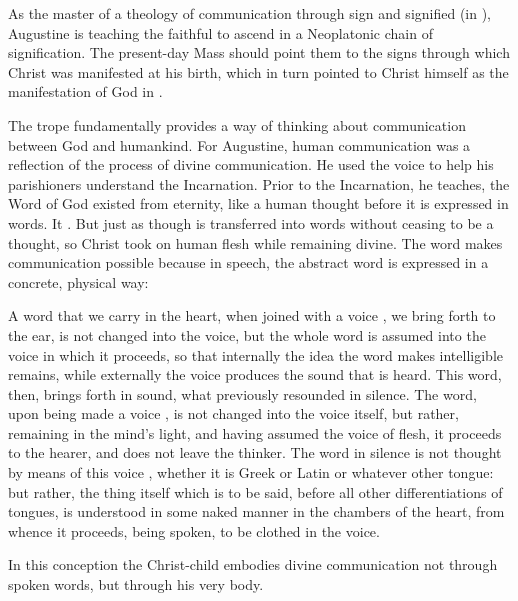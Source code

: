 As the master of a theology of communication through sign and signified (in
), Augustine is teaching the faithful to ascend in
a Neoplatonic chain of signification.
The present-day Mass should point them to the signs through which Christ was
manifested at his birth, which in turn pointed to Christ himself as the
manifestation of God in .

The  trope fundamentally provides a way of thinking about
communication between God and humankind.
For Augustine, human communication was a reflection of the process of divine
communication. 
He used the voice to help his parishioners understand the Incarnation.
Prior to the Incarnation, he teaches, the Word of God existed from eternity,
like a human thought before it is expressed in words.
It .%
    \Autocite[1001, Sermo 187, In Natali Domini 4]{Augustine:SermonesPL}
But just as though is transferred into words without ceasing to be a thought,
so Christ took on human flesh while remaining divine.
The word makes communication possible because in speech, the abstract word is
expressed in a concrete, physical way:
\begin{quoting}
    A word  that we carry in the heart, when
    joined with a voice , we bring
    forth to the ear, is not changed into the voice, but the whole word is
    assumed into the voice in which it proceeds, so that internally the idea the
    word makes intelligible remains, while externally the voice produces the
    sound that is heard.
    This word, then, brings forth in sound, what previously resounded in
    silence.  The word, upon being made a voice , is
    not changed into the voice itself, but rather, remaining in the mind's
    light, and having assumed the voice  of flesh, it proceeds to
    the hearer, and does not leave the thinker.
    The word in silence is not thought by means of this voice ,
    whether it is Greek or Latin or whatever other tongue: but rather, the thing
    itself which is to be said, before all other differentiations of tongues, is
    understood in some naked manner in the chambers of the heart, from whence it
    proceeds, being spoken, to be clothed in the voice.%
    \Autocites
    [1002, Sermo 187, In Natali Domini 4]{Augustine:SermonesPL}
    [on Christ as , see][872--889]{Lapide:Gospels19C}
\end{quoting}
In this conception the Christ-child embodies divine communication not through
spoken words, but through his very body.

